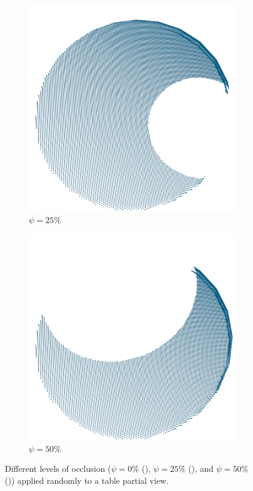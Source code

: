 \begin{figure}[!htb]
\begin{subfigure}{0.32\textwidth}
		\includegraphics[width=\linewidth]{Figures/ObjRecog/occlusion_25}
		\caption{$\psi=25\%$}
		\label{subfig:objrecog:occlusion:25}
	\end{subfigure}
	\hfill
	\begin{subfigure}{0.32\textwidth}
		\centering
		\includegraphics[width=\linewidth]{Figures/ObjRecog/occlusion_50}
		\caption{$\psi=50\%$}
		\label{subfig:objrecog:occlusion:50}
	\end{subfigure}
	\hfill
	\caption{Different levels of occlusion ($\psi=0\%$ (), $\psi=25\%$ (), and $\psi=50\%$ ()) applied randomly to a table partial view.}
	\label{fig:objrecog:occlusion}
\end{figure}

